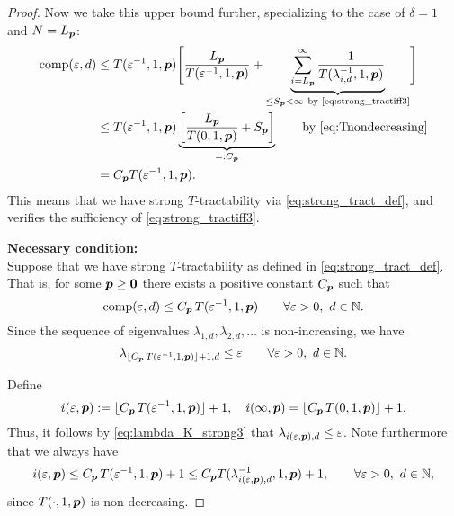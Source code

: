 \documentclass[sort&compress]{elsarticle}
\newcommand{\thed}{\delta}
\begin{document}
\begin{proof}
Now we take this upper bound further, specializing to the case of $\thed=1$ and $N=L_{\boldsymbol{p}}$:
\begin{align*}
       \operatorname{comp}(\varepsilon,d)
       & \le T(\varepsilon^{-1},1, \boldsymbol{p}) \Biggl [ \frac{L_{\boldsymbol{p}}}{T(\varepsilon^{-1},1, \boldsymbol{p})}  + \underbrace{\sum_{i=L_{\boldsymbol{p}}}^\infty \frac{1}{T(\lambda_{i, d}^{-1},1,\boldsymbol{p})}}_{\le S_{\boldsymbol{p}} <\infty\ \text{by \eqref{eq:strong_tractiff3}} }
        \Biggr] \\
       & \le T(\varepsilon^{-1},1,\boldsymbol{p}) \underbrace{\left[\frac{L_{\boldsymbol{p}}}{T(0,1, \boldsymbol{p})} + S_{\boldsymbol{p}} \right]}_{=:C_{\boldsymbol{p}}}
       \qquad \text{by \eqref{eq:Tnondecreasing}}\\
       & =  C_{\boldsymbol{p}}T(\varepsilon^{-1},1,\boldsymbol{p}).
\end{align*}
This means that we have strong $T$-tractability via \eqref{eq:strong_tract_def}, and verifies the sufficiency of \eqref{eq:strong_tractiff3}.



\bigskip
\noindent \textbf{Necessary condition:} \\
Suppose that we have strong
$T$-tractability as defined in \eqref{eq:strong_tract_def}. That is, for some $\boldsymbol{p} \ge \boldsymbol{0}$ there exists a positive constant $C_{\boldsymbol{p}}$ such that
\[
\operatorname{comp}(\varepsilon,d)\le C_{\boldsymbol{p}}\, T(\varepsilon^{-1},1,\boldsymbol{p})
\qquad \forall \varepsilon > 0, \ d \in \mathbb{N}.
\]
Since the sequence of eigenvalues $\lambda_{1,d}, \lambda_{2,d}, \ldots $ is non-increasing, we have
\begin{equation}\label{eq:lambda_K_strong3}
\lambda_{\lfloor C_{\boldsymbol{p}}\, T(\varepsilon^{-1},1,\boldsymbol{p})\rfloor +1,d}\le \varepsilon \qquad \forall \varepsilon > 0, \ d \in \mathbb{N}.
\end{equation}

Define
\[
i(\varepsilon,\boldsymbol{p}):= \lfloor C_{\boldsymbol{p}}\, T(\varepsilon^{-1},1,\boldsymbol{p})\rfloor +1, \quad
i(\infty,\boldsymbol{p}) =\lfloor C_{\boldsymbol{p}}\, T(0,1,\boldsymbol{p})\rfloor +1.
\]
Thus, it follows by \eqref{eq:lambda_K_strong3} that $\lambda_{i(\varepsilon,\boldsymbol{p}),d} \le \varepsilon$.
Note furthermore that we always have
\[
i(\varepsilon,\boldsymbol{p})\le C_{\boldsymbol{p}}\, T(\varepsilon^{-1},1,\boldsymbol{p})+1 \le C_{\boldsymbol{p}} T(\lambda_{i(\varepsilon,\boldsymbol{p}),d}^{-1},1,\boldsymbol{p})+1, \qquad \forall \varepsilon > 0, \ d \in \mathbb{N},
\]
since
$T(\cdot,1, \boldsymbol{p})$ is non-decreasing.


\end{proof}
\end{document}

